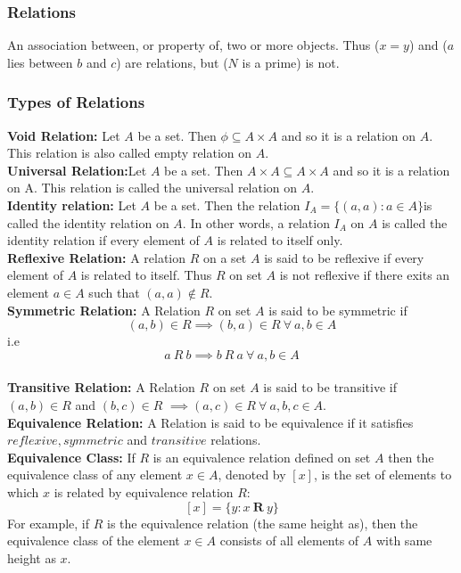 \documentclass[12pt]{article}
\begin{document}
\subsubsection{Relations}
An association between, or property of, two or more objects. Thus ($x=y$) and ($a$ lies between $b$ and $c$) are relations, but ($N$ is a prime) is not.
\subsubsection{Types of Relations}
\textbf{Void Relation:} Let $A$ be a set. Then $\phi \subseteq A \times A$ and so it is a relation on $A$. This relation is also called empty relation on $A$.\\
\textbf{Universal Relation:}Let $A$ be a set. Then $A\times A \subseteq A \times A$ and so it is a relation on A. This relation is called the universal relation on $A$.\\
\textbf{Identity relation:} Let $A$ be a set. Then the relation $I_A =\{(a,a):a \in A\}$is called the identity relation on $A$. In other words, a relation $I_A$ on $A$ is called the identity relation if every element of $A$ is related to itself only.\\
\textbf{Reflexive Relation:} A relation $R$ on a set $A$ is said to be reflexive if every element of $A$ is related to itself. Thus $R$ on set $A$ is not reflexive if there exits an element $a \in A$ such that $(a,a) \notin R$.\\
\textbf{Symmetric Relation:} A Relation $R$ on set $A$ is said to be symmetric if $$(a,b) \in R \implies (b,a) \in R \medspace \forall \medspace a,b \in A$$ i.e $$a \medspace R \medspace b \implies b \medspace R \medspace a \medspace \forall \medspace a,b \in A$$\\
\textbf{Transitive Relation:} A Relation $R$ on set $A$ is said to be transitive  if $(a,b) \in R$ and $(b,c) \in R$ $\implies (a,c) \in R \medspace \forall \medspace a,b,c \in A$.\\
\textbf{Equivalence Relation:} A Relation is said to be equivalence if it satisfies $reflexive,symmetric$ and $transitive$ relations.\\
\textbf{Equivalence Class:} If $R$ is an equivalence relation defined on set $A$ then the equivalence class of any element $x \in A$, denoted by $[x]$, is the set of elements to which $x$ is related by equivalence relation $R$: $$[x]=\{y:x \medspace \mathbf{R} \medspace y\}$$ For example, if $R$ is the equivalence relation (the same height as), then the equivalence class of the element $x \in A$ consists of all elements of $A$ with same height as $x$.
\end{document}

